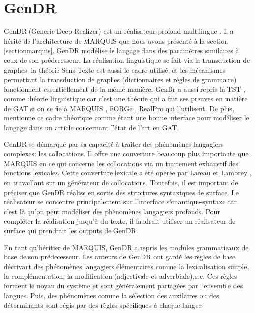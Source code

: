 
\chapter{GenDR}\label{chapgendr}

GenDR (Generic Deep Realizer) est un réalisateur profond multilingue \citep{lareau18}. Il a hérité de l'architecture de MARQUIS \cite{WannerMARQUISGENERATIONUSERTAILORED2010} que nous avons présenté à la section \ref{sectionmarquis}. GenDR modélise le langage dans des paramètres similaires à ceux de son prédecesseur. La réalisation linguistique se fait via la transduction de graphes, la théorie Sens-Texte est aussi le cadre utilisé, et les mécanismes permettant la transduction de graphes (dictionnaires et règles de grammaire) fonctionnent essentiellement de la même manière. GenDr a aussi repris la \ac{TST} \citep{melcuk1988},\citep{MelcukSemanticsmeaningtext2012} comme théorie linguistique car c'est une théorie qui a fait ses preuves en matière de \ac{GAT} si on se fie à MARQUIS \citep{WannerMARQUISGENERATIONUSERTAILORED2010}, FORGe \citep{MilledemoFORGePompeu2017}, RealPro \citep{LavoieFastPortableRealizer1997} qui l'utilisent. De plus, \cite{Vicentegeneracionlenguajenatural2015} mentionne ce cadre théorique comme étant une bonne interface pour modéliser le langage dans un article concernant l'état de l'art en \ac{GAT}.

GenDR se démarque par sa capacité à traiter des phénomènes langagiers complexes: les collocations. Il offre une couverture beaucoup plus importante que MARQUIS en ce qui concerne les collocations via un traitement exhaustif des fonctions lexicales. Cette couverture lexicale a été opérée par Lareau et Lambrey \cite{LambreyImplementationcollocationspour2017}, \cite{lambrey15} en travaillant sur un générateur de collocations. Toutefois, il est important de préciser que GenDR réalise en sortie des structures syntaxiques de surface. Le réalisateur se concentre principalement sur l'interface sémantique-syntaxe car c'est là qu'on peut modéliser des phénomènes langagiers profonds. Pour compléter la réalisation jusqu'à du texte, il faudrait utiliser un réalisateur de surface qui prendrait les outputs de GenDR.

En tant qu'héritier de MARQUIS, GenDR a repris les modules grammaticaux de base de son prédecesseur. Les auteurs de GenDR ont gardé les règles de base décrivant des phénomènes langagiers élémentaires comme la  lexicalisation simple, la complémentation, la modification (adjectivale et adverbiale),etc. Ces règles forment le noyau du système et sont généralement partagées par l'ensemble des langues. Puis, des phénomènes comme la sélection des auxilaires ou des déterminants sont régis par des règles spécifiques à chaque langue

